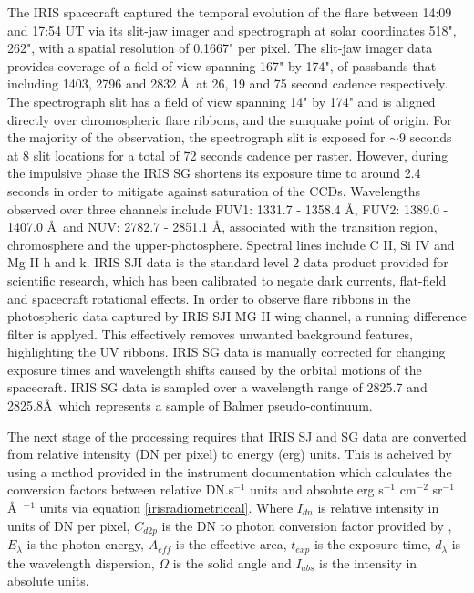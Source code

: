 The IRIS spacecraft captured the temporal evolution of the flare between 14:09 and 17:54 UT via its slit-jaw imager and spectrograph at solar coordinates 518", 262", with a spatial resolution of 0.1667" per pixel. The slit-jaw imager data provides coverage of a field of view spanning 167" by 174", of passbands that including 1403, 2796 and 2832 \AA\ at 26, 19 and 75 second cadence respectively. The spectrograph slit has a field of view spanning 14" by 174" and is aligned directly over chromospheric flare ribbons, and the sunquake point of origin. For the majority of the observation, the spectrograph slit is exposed for $\sim9$ seconds at 8 slit locations for a total of 72 seconds cadence per raster. However, during the impulsive phase the IRIS SG shortens its exposure time to around 2.4 seconds in order to mitigate against saturation of the CCDs. Wavelengths observed over three channels include FUV1: 1331.7 - 1358.4 \AA, FUV2: 1389.0 - 1407.0 \AA\ and NUV: 2782.7 - 2851.1 \AA, associated with the transition region, chromosphere and the upper-photosphere. Spectral lines include C II, Si IV and Mg II h and k. IRIS SJI data is the standard level 2 data product provided for scientific research, which has been calibrated to negate dark currents, flat-field and spacecraft rotational effects. In order to observe flare ribbons in the photospheric data captured by IRIS SJI MG II wing channel, a running difference filter is applyed. This effectively removes unwanted background features, highlighting the UV ribbons. IRIS SG data is manually corrected for changing exposure times and wavelength shifts caused by the orbital motions of the spacecraft. IRIS SG data is sampled over a wavelength range of 2825.7 and 2825.8\AA\ which represents a sample of Balmer pseudo-continuum. 

The next stage of the processing requires that IRIS SJ and SG data are converted from relative intensity (DN per pixel) to energy (erg) units. This is acheived by using a method provided in the instrument documentation \citep{2014SoPh..289.2733D} which calculates the conversion factors between relative DN.s$^{-1}$ units and absolute erg s$^{-1}$ cm$^{-2}$ sr$^{-1}$ \AA\ $^{-1}$ units via equation \ref{irisradiometriccal}. Where $I_{dn}$ is relative intensity in units of DN per pixel, $C_{d2p}$ is the DN to photon conversion factor provided by \cite{2014SoPh..289.2733D}, $E_{\lambda}$ is the photon energy, $A_{eff}$ is the effective area, $t_{exp}$ is the exposure time, $d_{\lambda}$ is the wavelength dispersion, $\Omega$ is the solid angle and $I_{abs}$ is the intensity in absolute units.

